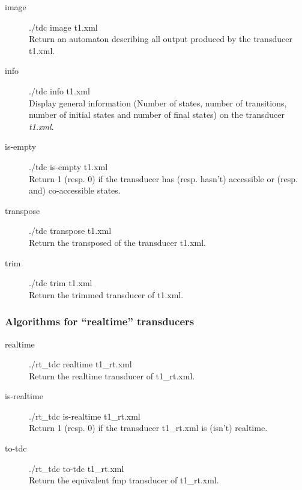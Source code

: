 \begin{description}
  \item [image]
    ./tdc image t1.xml\\
    Return an automaton describing all output produced by the
    transducer t1.xml.

  \item [info]
    ./tdc info t1.xml\\
    Display general information (Number of states, number of
    transitions, number of initial states and number of final
    states) on the transducer \textit{t1.xml}.

  \item [is-empty]
    ./tdc is-empty t1.xml\\
    Return 1 (resp. 0) if the transducer has (resp. hasn't) accessible
    or (resp. and) co-accessible states.

  \item [transpose]
    ./tdc transpose t1.xml\\
    Return the transposed of the transducer t1.xml.

  \item [trim]
    ./tdc trim t1.xml\\
    Return the trimmed transducer of t1.xml.
\end{description}

\subsubsection{Algorithms for ``realtime'' transducers}

\begin{description}
\item [realtime]
./rt\_tdc realtime t1\_rt.xml\\
Return the realtime transducer of t1\_rt.xml.

\item [is-realtime]
./rt\_tdc is-realtime t1\_rt.xml\\
Return 1 (resp. 0) if the transducer t1\_rt.xml is (isn't) realtime.

\item [to-tdc]
./rt\_tdc to-tdc t1\_rt.xml\\
Return the equivalent fmp transducer of t1\_rt.xml.
\end{description}

